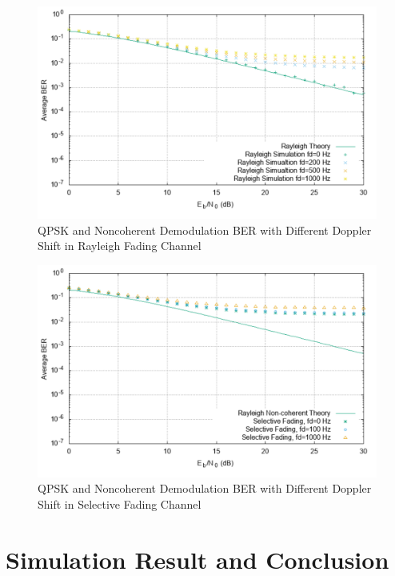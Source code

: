 \documentclass[technicalreport]{ieicej}
\begin{document}
\begin{figure}[tbp]
	\begin{center}
		\vspace{0cm}
		\includegraphics[width=\linewidth,clip]{fig/with_fd.pdf}
		\caption{QPSK and Noncoherent Demodulation BER with Different Doppler Shift in Rayleigh Fading Channel}
		\label{fig:sample}
	\end{center}
\end{figure}

\begin{figure}[tbp]
	\begin{center}
		\vspace{0cm}
		\includegraphics[width=\linewidth,clip]{fig/select.pdf}
		\caption{QPSK and Noncoherent Demodulation BER with Different Doppler Shift in Selective Fading Channel}
		\label{fig:sample}
	\end{center}
\end{figure}

\section{Simulation Result and Conclusion}



\end{document}
